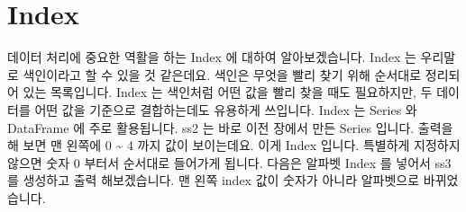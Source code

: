 \documentclass[letterpaper,10pt,english]{jupyterBook}
\begin{document}
\part{Index}
\label{\detokenize{chapter2/2.1.2_Python_Basics:index}}\label{\detokenize{chapter2/2.1.2_Python_Basics::doc}}
\sphinxAtStartPar
데이터 처리에 중요한 역활을 하는 Index 에 대하여 알아보겠습니다. Index 는 우리말로 색인이라고 할 수 있을 것 같은데요. 색인은 무엇을 빨리 찾기 위해 순서대로 정리되어 있는 목록입니다. Index 는 색인처럼 어떤 값을 빨리 찾을 때도 필요하지만, 두 데이터를 어떤 값을 기준으로 결합하는데도 유용하게 쓰입니다. Index 는 Series 와 DataFrame 에 주로 활용됩니다. ss2 는 바로 이전 장에서 만든 Series 입니다. 출력을 해 보면 맨 왼쪽에 0 \textasciitilde{} 4 까지 값이 보이는데요. 이게 Index 입니다. 특별하게 지정하지 않으면 숫자 0 부터서 순서대로 들어가게 됩니다. 다음은 알파벳 Index 를 넣어서 ss3 를 생성하고 출력 해보겠습니다. 맨 왼쪽 index 값이 숫자가 아니라 알파벳으로 바뀌었습니다.
\end{document}
